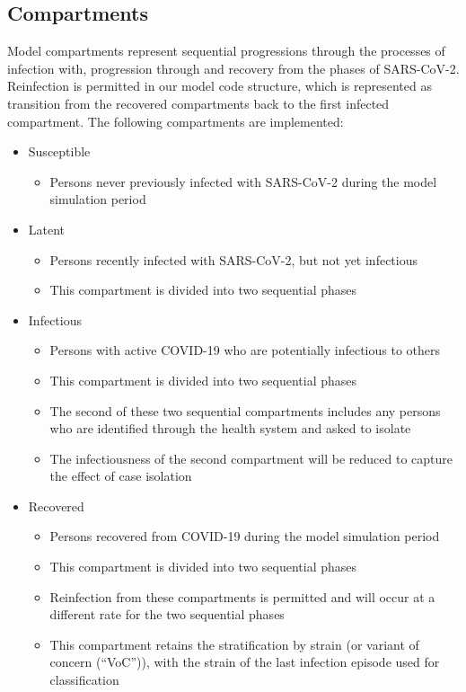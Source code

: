 \subsection{Compartments}
Model compartments represent sequential progressions through the processes of infection with, progression through and recovery from the phases of SARS-CoV-2.
Reinfection is permitted in our model code structure, which is represented as transition from the recovered compartments back to the first infected compartment.
The following compartments are implemented:
\begin{itemize}
    \item Susceptible
    \begin{itemize}
        \item Persons never previously infected with SARS-CoV-2 during the model simulation period
    \end{itemize}
    \item Latent
    \begin{itemize}
        \item Persons recently infected with SARS-CoV-2, but not yet infectious
        \item This compartment is divided into two sequential phases
    \end{itemize}
    \item Infectious
    \begin{itemize}
        \item Persons with active COVID-19 who are potentially infectious to others
        \item This compartment is divided into two sequential phases
        \item The second of these two sequential compartments includes any persons who are identified through the health system and asked to isolate
        \item The infectiousness of the second compartment will be reduced to capture the effect of case isolation
    \end{itemize}
    \item Recovered
    \begin{itemize}
        \item Persons recovered from COVID-19 during the model simulation period
        \item This compartment is divided into two sequential phases
        \item Reinfection from these compartments is permitted and will occur at a different rate for the two sequential phases
        \item This compartment retains the stratification by strain (or variant of concern (``VoC'')), with the strain of the last infection episode used for classification
    \end{itemize}
\end{itemize}


